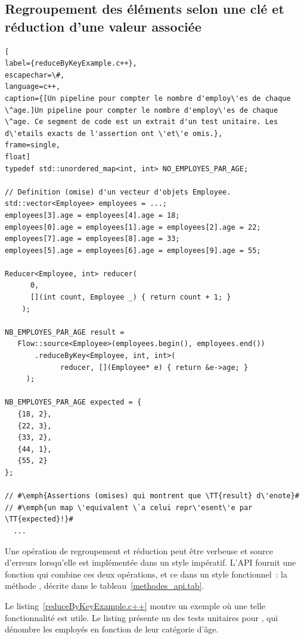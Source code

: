\subsection{Regroupement des \'el\'ements selon une cl\'e et r\'eduction d'une valeur associ\'ee}

\begin{lstlisting}[
label={reduceByKeyExample.c++},
escapechar=\#,
language=c++,
caption={[Un pipeline pour compter le nombre d'employ\'es de chaque \^age.]Un pipeline pour compter le nombre d'employ\'es de chaque \^age. Ce segment de code est un extrait d'un test unitaire. Les d\'etails exacts de l'assertion ont \'et\'e omis.},
frame=single,
float]
typedef std::unordered_map<int, int> NO_EMPLOYES_PAR_AGE;

// Definition (omise) d'un vecteur d'objets Employee.
std::vector<Employee> employees = ...; 
employees[3].age = employees[4].age = 18;
employees[0].age = employees[1].age = employees[2].age = 22;
employees[7].age = employees[8].age = 33;
employees[5].age = employees[6].age = employees[9].age = 55;

Reducer<Employee, int> reducer(
      0,
      [](int count, Employee _) { return count + 1; }
    );

NB_EMPLOYES_PAR_AGE result = 
   Flow::source<Employee>(employees.begin(), employees.end())
       .reduceByKey<Employee, int, int>(
             reducer, [](Employee* e) { return &e->age; }
     );
    
NB_EMPLOYES_PAR_AGE expected = {
   {18, 2},
   {22, 3},
   {33, 2},
   {44, 1},
   {55, 2}
};

// #\emph{Assertions (omises) qui montrent que \TT{result} d\'enote}#
// #\emph{un map \'equivalent \`a celui repr\'esent\'e par \TT{expected}!}#
  ...
\end{lstlisting}

Une op\'eration de regroupement et r\'eduction peut \^etre verbeuse et source d'erreurs lorsqu'elle est impl\'ement\'ee dans un style imp\'eratif. L'{API} fournit une fonction qui combine ces deux op\'erations, et ce  dans un style fonctionnel~: la m\'ethode , d\'ecrite dans le tableau~\ref{methodes_api.tab}. 

Le listing~\ref{reduceByKeyExample.c++} montre un exemple o\`u une telle fonctionnalit\'e est utile. Le listing pr\'esente un des tests unitaires pour , qui d\'enombre les employ\'es en fonction de leur cat\'egorie d'\^age. 

